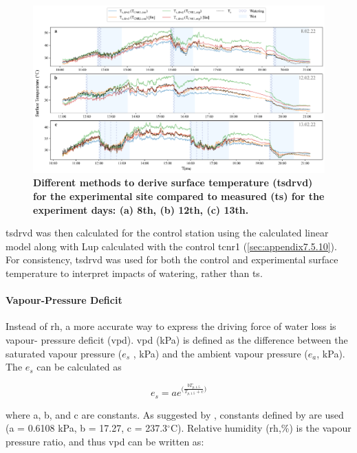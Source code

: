 \documentclass[final,3p,times,authoryear]{elsarticle}
\begin{document}
\begin{figure}
\centering
\includegraphics[trim={0 0 0 0},clip,scale=1.0]{pict027.png}
\caption{\bf Different methods to derive surface temperature (\gls{tsdrvd}) for the experimental site compared to measured (\gls{ts}) for the experiment days: (a) 8th, (b) 12th, (c) 13th.}
 \label{fig:7.8}
\end{figure}

\gls{tsdrvd} was then calculated for the control station using the calculated linear model along with \gls{Lup} calculated with the control \gls{tcnr1} (\ref{sec:appendix7.5.10}). For consistency, \gls{tsdrvd} was used for both the control and experimental surface temperature to interpret impacts of watering, rather than \gls{ts}.

\paragraph{Vapour-Pressure Deficit}\label{sec:appendix7.4.3}

Instead of \gls{rh}, a more accurate way to express the driving force of water loss is vapour-
pressure deficit (\gls{vpd}). \gls{vpd} (kPa) is defined as the difference between the saturated
vapour pressure ($e_{s}$ , kPa) and the ambient vapour pressure ($e_{a}$, kPa).
The $e_{s}$ can be calculated as

\begin{equation}
e_{s} = a e^{\bigg(  \frac{  bT_{p,1.5}   }{ T_{p,1.5} + c }    \bigg)}
\label{eq:7.7}
\end{equation}

where a, b, and c are constants. As suggested by \cite{McMahon2013}, constants defined by \cite{Allen1998} are used (a = 0.6108 kPa, b = 17.27, c = 237.3$^{\circ}$C). Relative humidity (\gls{rh},\%) is the vapour pressure ratio, and thus \gls{vpd} can be written as:
\end{document}
